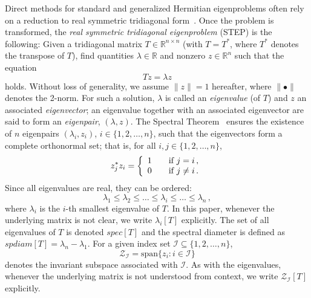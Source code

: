 \documentclass[final]{siamltex}
\newcommand{\R}{\mathbb{R}}
\newcommand{\Rn}{\R^{n}}
\newcommand{\Rnn}{\R^{n \times n}}
\newcommand\norm[1]{\lVert#1\rVert}
\begin{document}
Direct methods for standard and generalized Hermitian eigenproblems often rely on a
reduction to real symmetric tridiagonal form~\cite{Bai:2000:TSA:357352}. Once the
problem is transformed, the {\it real symmetric tridiagonal eigenproblem} (STEP)
is the following: Given a tridiagonal matrix $T \in \Rnn$ (with $T =
T^*$, where $T^*$ denotes the transpose of $T$), find quantities $\lambda
\in \R$ and nonzero $z \in \Rn$ such that the equation
\begin{equation*}
T z = \lambda z 
\end{equation*}
holds. Without loss of generality, we assume $\norm{z} = 1$ hereafter,
where $\norm{\bullet}$ denotes the 2-norm. For such a 
solution, $\lambda$ is called an \textit{eigenvalue} (of $T$) and $z$ an associated
\textit{eigenvector}; an eigenvalue together with an associated
eigenvector are said to form an \textit{eigenpair}, $(\lambda, z)$.
The Spectral Theorem~\cite{Parlett:1998:SEP} ensures the existence of
$n$ eigenpairs $(\lambda_i,z_i)$, $i \in
\{1,2,\ldots,n\}$, such that the
eigenvectors form a complete orthonormal set; that is, for all $i,j \in
\{1,2,\ldots,n\}$,   
\begin{equation*}
  z_j^* z_i = \left\{ 
\begin{array}{l l}
    1 & \quad \text{if $j = i$} \,, \\
    0 & \quad \text{if $j \neq i$} \,. \\
  \end{array} \right.
\end{equation*}
Since all eigenvalues are
real, they can be ordered:
\begin{equation*}
  \lambda_1 \leq \lambda_2 \leq \ldots \leq \lambda_i\leq \ldots \leq \lambda_n  \,,
\end{equation*}
where $\lambda_i$ is the $i$-th smallest eigenvalue of $T$. In
this paper, whenever the underlying matrix is not clear, we write
$\lambda_i[T]$ explicitly. The set of all eigenvalues of $T$ is denoted
$spec[T]$ and the spectral diameter is defined as $spdiam[T] = \lambda_n -
\lambda_1$. 
For a given 
index set $\mathcal{I}
\subseteq \{1,2,\ldots,n\}$,  
\begin{equation*}
  \mathcal{Z}_{\mathcal{I}} = \mbox{span} \{ z_i : i \in \mathcal{I}\}
\end{equation*}
denotes the invariant subspace associated with $\mathcal{I}$. As with the
eigenvalues, whenever the underlying matrix is not understood from context, we
write $\mathcal{Z}_{\mathcal{I}}[T]$ explicitly.
\end{document}
